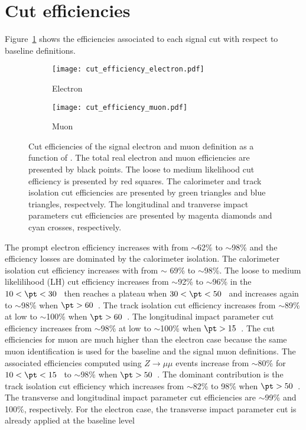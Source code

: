 \section{Cut efficiencies}
\label{sec:app_RLE_cut_efficiencies}
Figure~\ref{fig:app_RLE_cut_efficiencies} shows the efficiencies associated to each signal cut with respect to baseline definitions.
%
\begin{figure}[htb]
    \begin{subfigure}[b]{0.48\textwidth}
        \begin{center}
            \texttt{[image: cut\_efficiency\_electron.pdf]}
            \caption{Electron}
        \end{center}
    \end{subfigure}
    \begin{subfigure}[b]{0.48\textwidth}
        \begin{center}
            \texttt{[image: cut\_efficiency\_muon.pdf]}
            \caption{Muon}
        \end{center}
    \end{subfigure}
    \caption{Cut efficiencies of the signal electron and muon definition as a function of \pt.
    The total real electron and muon efficiencies are presented by black points. 
    The loose to medium likelihood cut efficiency is presented by red squares.
    The calorimeter and track isolation cut efficiencies are presented by green triangles and blue triangles, respectvely.
    The longitudinal and tranverse impact parameters cut efficiencies are presented by magenta diamonds and cyan crosses, respectively.}
    \label{fig:app_RLE_cut_efficiencies}
\end{figure}
%
The prompt electron efficiency increases with \pt from $\sim$62\% to $\sim$98\% and the efficiency losses are dominated by the calorimeter isolation.
The calorimeter isolation cut efficiency increases with \pt from $\sim$ 69\% to $\sim$98\%.
The loose to medium likelilihood (LH) cut efficiency increases from $\sim$92\% to $\sim$96\% in the $10< \pt < 30$~{\GeV} then reaches a plateau when $30 < \pt < 50$~{\GeV} and increases again to $\sim$98\% when $\pt > 60$~{\GeV}.
The track isolation cut efficiency increases from $\sim$89\% at low \pt to $\sim$100\% when $\pt > 60$~{\GeV}.
The longitudinal impact parameter cut efficiency increases from $\sim$98\% at low \pt to $\sim$100\% when $\pt > 15$~{\GeV}.
The cut efficiencies for muon are much higher than the electron case because the same muon identification is used for the baseline and the signal muon definitions.
The associated efficiencies computed using $Z\to \mu \mu$ events increase from $\sim$80\% for $10 < \pt < 15$~{\GeV} to $\sim$98\% when $\pt > 50$~{\GeV}.
The dominant contribution is the track isolation cut efficiency which increases from $\sim$82\% to 98\% when $\pt > 50$~{\GeV}.
The transverse and longitudinal impact parameter cut efficiencies are $\sim$99\% and 100\%, respectively.
For the electron case, the transverse impact parameter cut is already applied at the baseline level

